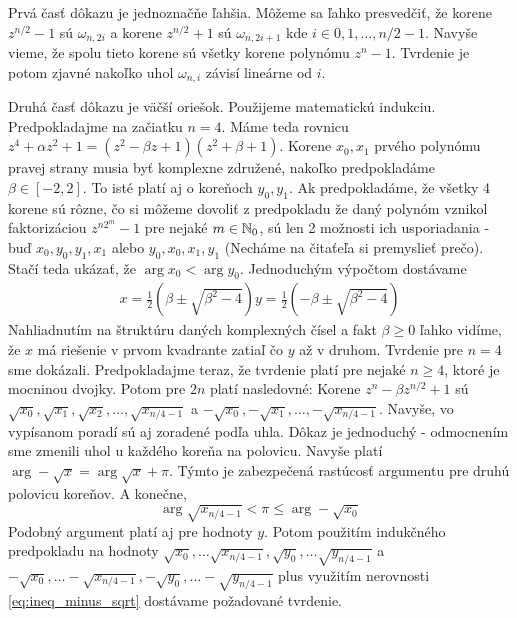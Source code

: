 \begin{dokaz}
Prvá časť dôkazu je jednoznačňe ľahšia. Môžeme sa ľahko presvedčiť, že korene
$z^{n/2}-1$ sú $\omega_{n,2i}$ a korene $z^{n/2}+1$ sú
$\omega_{n,2i+1}$ kde $i\in 0,1,\dots, n/2-1$. Navyše vieme, že spolu
tieto korene sú všetky korene polynómu $z^n-1$. Tvrdenie je potom
zjavné nakoľko uhol $\omega_{n,i}$ závisí lineárne od $i$.

Druhá časť dôkazu je väčší oriešok. Použijeme matematickú indukciu.
Predpokladajme na začiatku $n=4$.
Máme teda rovnicu
$z^4 + \alpha z^2 + 1 = (z^2 - \beta z + 1)(z^2 + \beta + 1)$.
Korene $x_0,x_1$ prvého polynómu pravej strany musia byť komplexne
združené, nakoľko predpokladáme $\beta\in[-2,2]$. To isté platí
aj o koreňoch $y_0,y_1$. Ak predpokladáme, že všetky 4 korene sú
rôzne, čo si môžeme dovoliť z predpokladu že daný polynóm vznikol
faktorizáciou $z^{n 2^m} -1$ pre nejaké $m\in\mathbb{N}_0$,
sú len 2 možnosti ich usporiadania -
buď $x_0,y_0,y_1,x_1$ alebo $y_0,x_0,x_1,y_1$ (Necháme na čitaťeľa si
premyslieť prečo). Stačí teda ukázať, že $\arg x_0 < \arg y_0$.
Jednoduchým výpočtom dostávame 
\begin{align}
    x = \frac{1}{2} (\beta \pm \sqrt{\beta^2 - 4})
    y = \frac{1}{2} (-\beta \pm \sqrt{\beta^2 - 4})
\end{align}
Nahliadnutím na štruktúru daných komplexných čísel a fakt $\beta\ge0$
ľahko vidíme, že $x$ má riešenie v prvom kvadrante zatiaľ čo $y$ až v
druhom. Tvrdenie pre $n=4$ sme dokázali.
Predpokladajme teraz, že tvrdenie platí pre nejaké $n\ge4$, ktoré je
mocninou dvojky.
Potom pre $2n$ platí nasledovné:
Korene $z^n - \beta z^{n/2} + 1$ sú $\sqrt{x_0},\sqrt{x_1},\sqrt{x_2},
\dots,\sqrt{x_{n/4-1}}$ a $ -\sqrt{x_0}, -\sqrt{x_1}, \dots,
-\sqrt{x_{n/4-1}}$. Navyše, vo vypísanom poradí sú aj zoradené podľa
uhla. Dôkaz je jednoduchý - odmocnením sme zmenili uhol u každého
koreňa na polovicu. Navyše platí $\arg -\sqrt{x}=\arg \sqrt{x} + \pi$.
Týmto je zabezpečená rastúcosť argumentu pre druhú polovicu koreňov.
A konečne, 
\begin{equation}
    \arg \sqrt{x_{n/4-1}} < \pi \le \arg -\sqrt{x_0}
    \label{eq:ineq_minus_sqrt}
\end{equation}
Podobný argument platí aj pre hodnoty $y$. Potom použitím indukčného
predpokladu na hodnoty 
$\sqrt{x_0},\dots \sqrt{x_{n/4-1}},
 \sqrt{y_0},\dots \sqrt{y_{n/4-1}}$ a
$-\sqrt{x_0},\dots -\sqrt{x_{n/4-1}},
 -\sqrt{y_0},\dots -\sqrt{y_{n/4-1}}$ plus
 využitím nerovnosti \ref{eq:ineq_minus_sqrt} dostávame požadované
 tvrdenie.
\end{dokaz}



